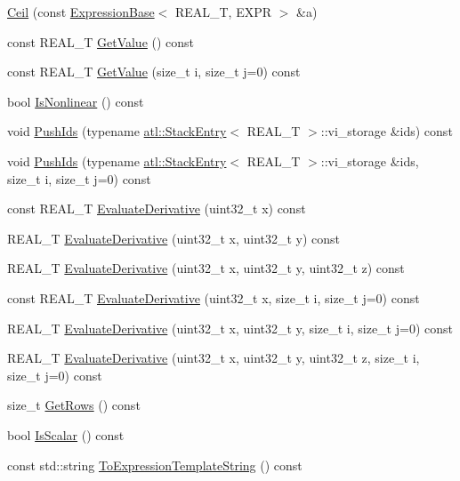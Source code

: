 \begin{DoxyCompactItemize}
\item 
\hyperlink{structatl_1_1_ceil_a77b35f66ea63f9f52445bb3bdb2ae254}{Ceil} (const \hyperlink{structatl_1_1_expression_base}{Expression\+Base}$<$ R\+E\+A\+L\+\_\+\+T, E\+X\+P\+R $>$ \&a)
\item 
const R\+E\+A\+L\+\_\+\+T \hyperlink{structatl_1_1_ceil_a7a666fa878458db83fdf26675df3c977}{Get\+Value} () const 
\item 
const R\+E\+A\+L\+\_\+\+T \hyperlink{structatl_1_1_ceil_a8191d630fa233e453bb1c9b19a82d189}{Get\+Value} (size\+\_\+t i, size\+\_\+t j=0) const 
\item 
bool \hyperlink{structatl_1_1_ceil_aa27a1b182c49a808b0640b2ffb0198e3}{Is\+Nonlinear} () const 
\item 
void \hyperlink{structatl_1_1_ceil_a1d418e693c8e74abbc0383a0159a0b31}{Push\+Ids} (typename \hyperlink{structatl_1_1_stack_entry}{atl\+::\+Stack\+Entry}$<$ R\+E\+A\+L\+\_\+\+T $>$\+::vi\+\_\+storage \&ids) const 
\item 
void \hyperlink{structatl_1_1_ceil_a5b445cc02c0668379f8b3fdce1eac855}{Push\+Ids} (typename \hyperlink{structatl_1_1_stack_entry}{atl\+::\+Stack\+Entry}$<$ R\+E\+A\+L\+\_\+\+T $>$\+::vi\+\_\+storage \&ids, size\+\_\+t i, size\+\_\+t j=0) const 
\item 
const R\+E\+A\+L\+\_\+\+T \hyperlink{structatl_1_1_ceil_acb53a63ec3bd24e33335bef5d326ac0a}{Evaluate\+Derivative} (uint32\+\_\+t x) const 
\item 
R\+E\+A\+L\+\_\+\+T \hyperlink{structatl_1_1_ceil_a5bca6daf83b7f3e165d4c652d8e7b4e8}{Evaluate\+Derivative} (uint32\+\_\+t x, uint32\+\_\+t y) const 
\item 
R\+E\+A\+L\+\_\+\+T \hyperlink{structatl_1_1_ceil_a3164f3d2a1aeca0e1ab1c2bbb6f0f2a8}{Evaluate\+Derivative} (uint32\+\_\+t x, uint32\+\_\+t y, uint32\+\_\+t z) const 
\item 
const R\+E\+A\+L\+\_\+\+T \hyperlink{structatl_1_1_ceil_a9880875b3dab28bd33fe1f5e4d466e53}{Evaluate\+Derivative} (uint32\+\_\+t x, size\+\_\+t i, size\+\_\+t j=0) const 
\item 
R\+E\+A\+L\+\_\+\+T \hyperlink{structatl_1_1_ceil_aa2aad8819ecdb994e133e085aa20bb83}{Evaluate\+Derivative} (uint32\+\_\+t x, uint32\+\_\+t y, size\+\_\+t i, size\+\_\+t j=0) const 
\item 
R\+E\+A\+L\+\_\+\+T \hyperlink{structatl_1_1_ceil_a3e2406be290b04eada376b04436bd7fa}{Evaluate\+Derivative} (uint32\+\_\+t x, uint32\+\_\+t y, uint32\+\_\+t z, size\+\_\+t i, size\+\_\+t j=0) const 
\item 
size\+\_\+t \hyperlink{structatl_1_1_ceil_ada0a7f2d030572e2e4706388c0aded4a}{Get\+Rows} () const 
\item 
bool \hyperlink{structatl_1_1_ceil_a1e16ac8e0c238584c8f9836ef1cf176f}{Is\+Scalar} () const 
\item 
const std\+::string \hyperlink{structatl_1_1_ceil_a8f90da2fe07fc2523f845fa12d28c795}{To\+Expression\+Template\+String} () const 
\end{DoxyCompactItemize}
